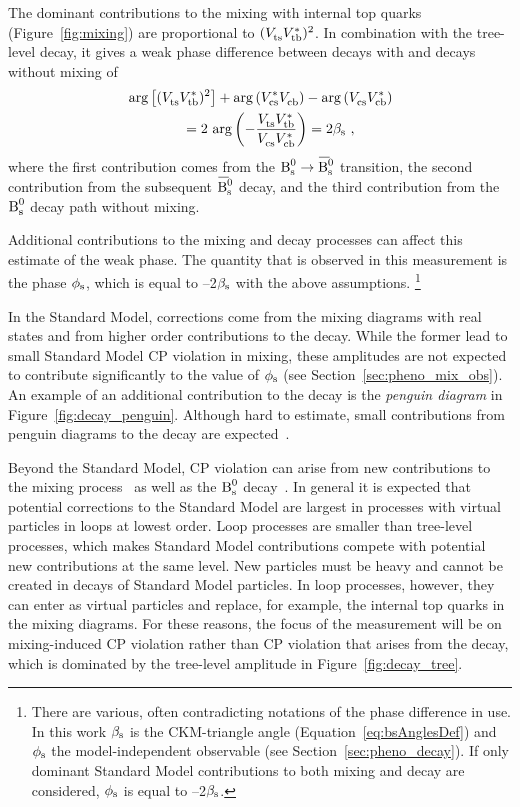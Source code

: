 The dominant contributions to the \BsBsbar{} mixing with internal top quarks (Figure~\ref{fig:mixing}) are proportional to
$(\Vts\Vtb[*])^2$. In combination with the tree-level decay, it gives a weak phase difference between decays with and decays without mixing
of
\begin{equation}
  \label{eq:betasCKM}
  \begin{split}
    &\arg\left[(\Vts\Vtb[*])^2\right] + \arg\left(\Vcs[*]\Vcb\right) - \arg\left(\Vcs\Vcb[*]\right) \\
    &\qquad\qquad= 2\,\arg\left(-\frac{\Vts\Vtb[*]}{\Vcs\Vcb[*]}\right) = 2\bs
    \ ,
  \end{split}
\end{equation}
where the first contribution comes from the $\Bs\to\Bsbar$ transition, the second contribution from the subsequent $\Bsbar$ decay, and the
third contribution from the $\text{B}_\text{s}^\text{0}$ decay path without mixing.

Additional contributions to the mixing and decay processes can affect this estimate of the weak phase. The quantity that is observed in
this measurement is the phase $\phi_\text{s}$, which is equal to --2$\beta_\text{s}$ with the above assumptions.%
\footnote{There are various, often contradicting notations of the phase difference in use. In this work $\beta_\text{s}$ is the CKM-triangle angle
(Equation~\ref{eq:bsAnglesDef}) and $\phi_\text{s}$ the model-independent observable (see Section~\ref{sec:pheno_decay}). If only dominant
Standard Model contributions to both mixing and decay are considered, $\phi_\text{s}$ is equal to --2$\beta_\text{s}$.}

In the Standard Model, corrections come from the mixing diagrams with real states and from higher order contributions to the decay.  While
the former lead to small Standard Model CP violation in mixing, these amplitudes are not expected to contribute significantly to the value
of $\phi_\text{s}$ (see Section~\ref{sec:pheno_mix_obs}). An example of an additional contribution to the decay is the \emph{penguin diagram} in
Figure~\ref{fig:decay_penguin}. Although hard to estimate, small contributions from penguin diagrams to the decay are
expected~\cite{Faller:2008gt,*Bhattacharya:2012ph}.

Beyond the Standard Model, CP violation can arise from new contributions to the \BsBsbar{} mixing
process~\cite{Nir:1990hj,*Silverman:1998uj,*Ball:1999yi,*Dunietz:2000cr,Buras:2009if} as well as the $\text{B}_\text{s}^\text{0}$
decay~\cite{Chiang:2009ev,*Datta:2009fk}. In general it is expected that potential corrections to the Standard Model are largest in
processes with virtual particles in loops at lowest order. Loop processes are smaller than tree-level processes, which makes Standard Model
contributions compete with potential new contributions at the same level. New particles must be heavy and cannot be created in decays of
Standard Model particles. In loop processes, however, they can enter as virtual particles and replace, for example, the internal top quarks
in the \BsBsbar{} mixing diagrams. For these reasons, the focus of the measurement will be on mixing-induced CP violation rather than CP
violation that arises from the \BstoJpsiphi{} decay, which is dominated by the tree-level amplitude in Figure~\ref{fig:decay_tree}.

